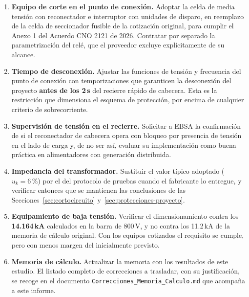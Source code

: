 \documentclass[11pt,a4paper]{article}
\begin{document}
\begin{enumerate}
\item \textbf{Equipo de corte en el punto de conexi\'on.} Adoptar la celda de
media tensi\'on con reconectador e interruptor con unidades de disparo, en
reemplazo de la celda de seccionador fusible de la cotizaci\'on original, para
cumplir el Anexo 1 del Acuerdo CNO 2121 de 2026. Contratar por separado la
parametrizaci\'on del rel\'e, que el proveedor excluye expl\'icitamente de su
alcance.

\item \textbf{Tiempo de desconexi\'on.} Ajustar las funciones de tensi\'on y
frecuencia del punto de conexi\'on con temporizaciones que garanticen la
desconexi\'on del proyecto \textbf{antes de los 2\,s} del recierre r\'apido de
cabecera. Esta es la restricci\'on que dimensiona el esquema de protecci\'on, por
encima de cualquier criterio de sobrecorriente.

\item \textbf{Supervisi\'on de tensi\'on en el recierre.} Solicitar a EBSA la
confirmaci\'on de si el reconectador de cabecera opera con bloqueo por presencia
de tensi\'on en el lado de carga y, de no ser as\'i, evaluar su implementaci\'on
como buena pr\'actica en alimentadores con generaci\'on distribuida.

\item \textbf{Impedancia del transformador.} Sustituir el valor t\'ipico
adoptado ($u_k = 6\,\%$) por el del protocolo de pruebas cuando el fabricante lo
entregue, y verificar entonces que se mantienen las conclusiones de las
Secciones~\ref{sec:cortocircuito} y~\ref{sec:protecciones-proyecto}.

\item \textbf{Equipamiento de baja tensi\'on.} Verificar el dimensionamiento
contra los \textbf{14.164\,kA} calculados en la barra de 800\,V, y no contra los
11.2\,kA de la memoria de c\'alculo original. Con los equipos cotizados el
requisito se cumple, pero con menos margen del inicialmente previsto.

\item \textbf{Memoria de c\'alculo.} Actualizar la memoria con los resultados de
este estudio. El listado completo de correcciones a trasladar, con su
justificaci\'on, se recoge en el documento \texttt{Correcciones\_Memoria\_Calculo.md}
que acompa\~na a este informe.
\end{enumerate}

\appendix
\end{document}
